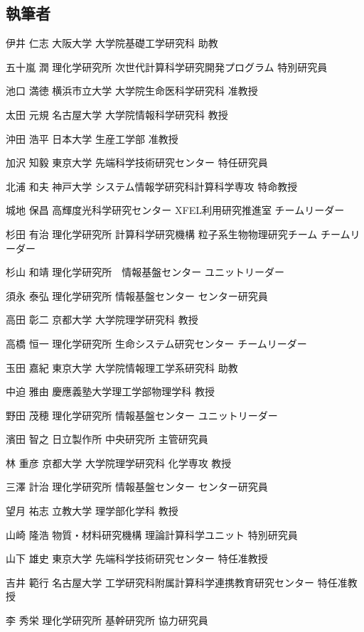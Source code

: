 \begin{執筆者一覧}
\subsection{執筆者}
\item
{伊井 仁志}
{大阪大学 大学院基礎工学研究科}
{助教}
\item
{五十嵐 潤}
{理化学研究所 次世代計算科学研究開発プログラム}
{特別研究員}
\item
{池口 満徳}
{横浜市立大学 大学院生命医科学研究科}
{准教授}
\item
{太田 元規}
{名古屋大学 大学院情報科学研究科}
{教授}
\item
{沖田 浩平}
{日本大学 生産工学部}
{准教授}
\item
{加沢 知毅}
{東京大学 先端科学技術研究センター}
{特任研究員}
\item
{北浦 和夫}
{神戸大学 システム情報学研究科計算科学専攻}
{特命教授}
\item
{城地 保昌}
{高輝度光科学研究センター XFEL利用研究推進室}
{チームリーダー}
\item
{杉田 有治}
{理化学研究所 計算科学研究機構 粒子系生物物理研究チーム}
{チームリーダー}
\item
{杉山 和靖}
{理化学研究所　情報基盤センター}
{ユニットリーダー}
\item
{須永 泰弘}
{理化学研究所 情報基盤センター}
{センター研究員}
\item
{高田 彰二}
{京都大学 大学院理学研究科}
{教授}
\item
{高橋 恒一}
{理化学研究所 生命システム研究センター}
{チームリーダー}
\item
{玉田 嘉紀}
{東京大学 大学院情報理工学系研究科}
{助教}
\item
{中迫 雅由}
{慶應義塾大学理工学部物理学科}
{教授}
\item
{野田 茂穂}
{理化学研究所 情報基盤センター}
{ユニットリーダー}
\item
{濱田 智之}
{日立製作所 中央研究所}
{主管研究員}
\item
{林 重彦}
{京都大学 大学院理学研究科 化学専攻}
{教授}
\item
{三澤 計治}
{理化学研究所 情報基盤センター}
{センター研究員}
\item
{望月 祐志}
{立教大学 理学部化学科}
{教授}
\item
{山崎 隆浩}
{物質・材料研究機構 理論計算科学ユニット}
{特別研究員}
\item
{山下 雄史}
{東京大学 先端科学技術研究センター}
{特任准教授}
\item
{吉井 範行}
{名古屋大学 工学研究科附属計算科学連携教育研究センター}
{特任准教授}
\item
{李 秀栄}
{理化学研究所 基幹研究所}
{協力研究員}

\end{執筆者一覧}
